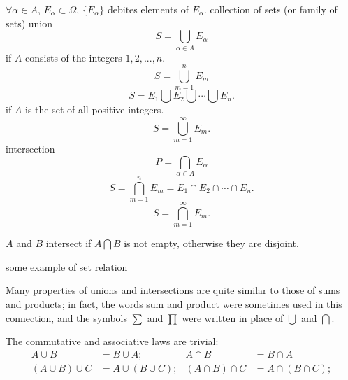 \begin{mydef}
    \label{mydef:2.9}
    $\forall \alpha\in A$, $E_\alpha \subset \Omega$, $\{E_\alpha\}$ debites elements of $E_\alpha$. 
    collection of sets (or family of sets)  
    union
    \begin{equation}
        \label{eq:2.1}
        S = \bigcup_{\alpha\in A} E_\alpha
    \end{equation}
    if $A$ consists of the integers $1,2,...,n$.
    \begin{equation}
        \label{eq:2.2}
        S = \bigcup_{m=1}^n E_m
    \end{equation}
    \begin{equation}
        \label{eq:2.3}
        S = E_1 \bigcup E_2 \bigcup \cdots \bigcup E_n.
    \end{equation}
    if $A$ is the set of all positive integers.
    \begin{equation}
        \label{eq:2.4}
        S = \bigcup_{m=1}^{\infty} E_m.
    \end{equation}
    intersection
    \begin{equation}
        \label{eq:2.5}
        P = \bigcap_{\alpha\in A} E_\alpha
    \end{equation}
    \begin{equation}
        \label{eq:2.6}
        S = \bigcap_{m=1}^n E_m = E_1 \cap E_2 \cap \cdots \cap E_n.
    \end{equation}
    \begin{equation}
        \label{eq:2.7}
        S = \bigcap_{m=1}^{\infty} E_m.
    \end{equation}

    $A$ and $B$ intersect if $A\bigcap B$ is not empty, otherwise they are disjoint.
\end{mydef}

\begin{myExample}
    some example of set relation
\end{myExample}

\begin{myRemark}
    Many properties of unions and intersections are quite similar to those of sums and products; in fact, the words sum and product were sometimes used in this connection, and the symbols $\sum$ and $\prod$ were written in place of $\bigcup$ and $\bigcap$.
\end{myRemark}

The commutative and associative laws are trivial:
\begin{align}
        A \cup B &= B \cup A; &
        A \cap B &= B \cap A \label{eq:2.8} \\
        \left(A \cup B\right) \cup C &= A \cup \left(B \cup C\right); &
        \left(A \cap B\right) \cap C &= A \cap \left(B \cap C\right);\label{eq:2.9}
\end{align}

